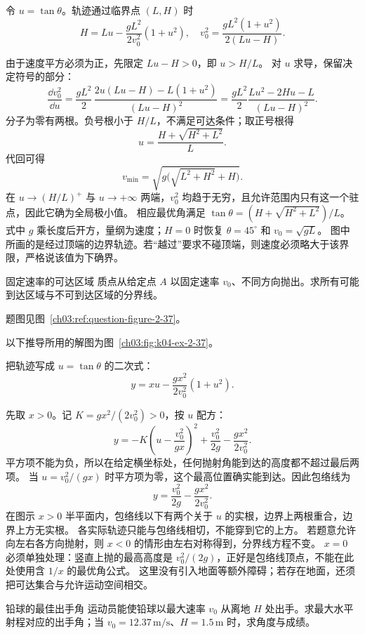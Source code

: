 {\begin{xesolution}
令 $u=\tan\theta$。轨迹通过临界点 $(L,H)$ 时
\[
H=Lu-\frac{gL^2}{2v_0^2}(1+u^2),
\quad
v_0^2=\frac{gL^2(1+u^2)}{2(Lu-H)}.
\]
\ObstacleClearanceDiagram

由于速度平方必须为正，先限定 $Lu-H>0$，即 $u>H/L$。
对 $u$ 求导，保留决定符号的部分：
\[
 \frac{\dd v_0^2}{\dd u}
 =\frac{gL^2}{2}\,
 \frac{2u(Lu-H)-L(1+u^2)}{(Lu-H)^2}
 =\frac{gL^2}{2}\frac{Lu^2-2Hu-L}{(Lu-H)^2}.
\]
分子为零有两根。负号根小于 $H/L$，不满足可达条件；取正号根得
\[
u=\frac{H+\sqrt{H^2+L^2}}{L}.
\]
代回可得
\[
 \boxed{v_{\min}=\sqrt{g\bigl(\sqrt{L^2+H^2}+H\bigr)}}.
\]
在 $u\to(H/L)^+$ 与 $u\to+\infty$ 两端，$v_0^2$ 均趋于无穷，且允许范围内只有这一个驻点，因此它确为全局极小值。
相应最优角满足 $\tan\theta=(H+\sqrt{H^2+L^2})/L$。
式中 $g$ 乘长度后开方，量纲为速度；$H=0$ 时恢复 $\theta=45^\circ$ 和 $v_0=\sqrt{gL}$。
图中所画的是经过顶端的边界轨迹。若“越过”要求不碰顶端，则速度必须略大于该界限，严格说该值为下确界。
\end{xesolution}

\begin{origexamplebox}{固定速率的可达区域}\label{ch03:ex:k04-2-37}
质点从给定点 $A$ 以固定速率 $v_0$、不同方向抛出。求所有可能到达区域与不可到达区域的分界线。
\par 题图见图~\ref{ch03:ref:question-figure-2-37}。
\KQuestionBL
\end{origexamplebox}
\begin{xesolution}
以下推导所用的解图为图~\ref{ch03:fig:k04-ex-2-37}。

把轨迹写成 $u=\tan\theta$ 的二次式：
\[
y=xu-\frac{gx^2}{2v_0^2}(1+u^2).
\]
\ProjectileReachabilityDiagram

先取 $x>0$。记 $K=gx^2/(2v_0^2)>0$，按 $u$ 配方：
\[
 y=-K\left(u-\frac{v_0^2}{gx}\right)^2
    +\frac{v_0^2}{2g}-\frac{gx^2}{2v_0^2}.
\]
平方项不能为负，所以在给定横坐标处，任何抛射角能到达的高度都不超过最后两项。
当 $u=v_0^2/(gx)$ 时平方项为零，这个最高位置确实能到达。因此包络线为
\[
 \boxed{y=\frac{v_0^2}{2g}-\frac{gx^2}{2v_0^2}}.
\]
在图示 $x>0$ 半平面内，包络线以下有两个关于 $u$ 的实根，边界上两根重合，边界上方无实根。
各实际轨迹只能与包络线相切，不能穿到它的上方。
若题意允许向左右各方向抛射，则 $x<0$ 的情形由左右对称得到，分界线方程不变。
$x=0$ 必须单独处理：竖直上抛的最高高度是 $v_0^2/(2g)$，正好是包络线顶点，不能在此处使用含 $1/x$ 的最优角公式。
这里没有引入地面等额外障碍；若存在地面，还须把可达集合与允许运动空间相交。
\end{xesolution}


\begin{origexamplebox}{铅球的最佳出手角}\label{ch03:ex:k04-2-38}
运动员能使铅球以最大速率 $v_0$ 从离地 $H$ 处出手。求最大水平射程对应的出手角；当 $v_0=12.37\,\mathrm{m/s}$、$H=1.5\,\mathrm m$ 时，求角度与成绩。


\end{origexamplebox}}
